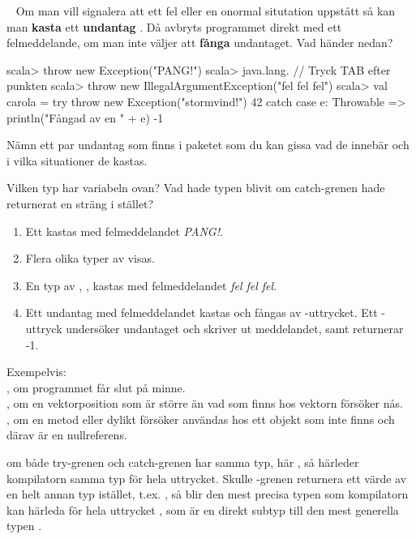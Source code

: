 \QUESTBEGIN

\Task  \what~  Om man vill signalera att ett fel eller en onormal situtation uppstått så kan man \textbf{kasta}  ett \textbf{undantag} . Då avbryts programmet direkt med ett felmeddelande, om man inte väljer att \textbf{fånga}  undantaget.
\Subtask Vad händer nedan?
\begin{REPL}
scala> throw new Exception("PANG!")
scala> java.lang.   // Tryck TAB efter punkten
scala> throw new IllegalArgumentException("fel fel fel")
scala> val carola = 
         try 
           throw new Exception("stormvind!")
           42
         catch 
           case e: Throwable => 
             println("Fångad av en " + e)
             -1
\end{REPL}
\Subtask Nämn ett par undantag som finns i paketet  som du kan gissa vad de innebär och i vilka situationer de kastas.

\Subtask Vilken typ har variabeln  ovan? Vad hade typen blivit om catch-grenen hade returnerat en sträng i stället?

\SOLUTION


\TaskSolved \what


\SubtaskSolved  \begin{enumerate}
\item Ett  kastas med felmeddelandet \textit{PANG!}.
\item Flera olika typer av  visas.
\item En typ av , , kastas med felmeddelandet \textit{fel fel fel}.
\item Ett undantag med felmeddelandet  kastas och fångas av -uttrycket. Ett -uttryck undersöker undantaget och skriver ut meddelandet, samt returnerar -1.
\end{enumerate}

\SubtaskSolved  Exempelvis: \\
, om programmet får slut på minne.\\
, om en vektorposition som är större än vad som finns hos vektorn försöker nås.\\
, om en metod eller dylikt försöker användas hos ett objekt som inte finns och därav är en nullreferens.

\SubtaskSolved  om både try-grenen och catch-grenen har samma typ, här , så härleder kompilatorn samma typ för hela uttrycket. 
Skulle -grenen returnera ett värde av en helt annan typ istället, t.ex. , så blir den mest precisa typen som kompilatorn kan härleda för hela uttrycket , som är en direkt subtyp till den mest generella typen .



